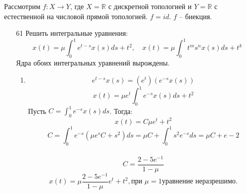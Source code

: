 \documentclass[a4paper, 12pt]{report}
\theoremstyle{definition}
\theoremstyle{remark}
\begin{document}
\begin{large}
    Рассмотрим $f: X \to Y$, где $X = \mathbb{R}$ с дискретной топологией и $Y = \mathbb R$ с естественной на числовой прямой топологией.
    $f = id$. $f$ -- биекция.
\begin{enumerate}




    
    \item[61] Решить интегральные уравнения:
    \[x(t) = \mu \int_0^1 e^{t-s} x(s) ds + t^2, \quad x(t) = \mu \int_0^1 t^m s^n x(s) ds + t^k\]
    Ядра обоих интегральных уравнений вырождены.
    \begin{enumerate}
        \item \[e^{t-s}x(s) = (e^t)(e^{-s}x(s))\]
        \[x(t) = \mu e^t\int_0^1 e^{-s}x(s) ds + t^2\]
        Пусть $C = \int_0^1 e^{-s}x(s) ds$. Тогда:
        \[x(t) = C\mu e^t + t^2\]
        \[C = \int_0^1 e^{-s} (\mu e^s C+s^2)ds = \mu C + \int_0^1 s^2e^{-s}ds =  \mu C + e - 2\]\
        \[C = \frac{2-5e^{-1}}{1-\mu}\]
        \[x(t) = \mu \frac{2-5e^{-1}}{1-\mu} e^t + t^2, \text{при } \mu = 1\text{уравнение неразрешимо.}\]
    

\end{enumerate}
\end{enumerate}
\end{large}
\end{document}
